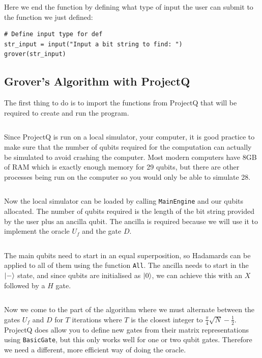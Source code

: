 Here we end the function by defining what type of input the user can submit to the function we just defined:

\begin{verbatim}
# Define input type for def
str_input = input("Input a bit string to find: ")
grover(str_input) 
\end{verbatim}

\subsection{Grover's Algorithm with ProjectQ}

The first thing to do is to import the functions from ProjectQ that will be required to create and run the program.

\inputminted[firstnumber=3, firstline=3, lastline=5]{python}{code/ProjectQ/grover_projectq_guide.txt}

Since ProjectQ is run on a local simulator, your computer, it is good practice to make sure that the number of qubits required for the computation can actually be simulated to avoid crashing the computer. Most modern computers have 8GB of RAM which is exactly enough memory for 29 qubits, but there are other processes being run on the computer so you would only be able to simulate 28.

\inputminted[firstnumber=13, firstline= 13, lastline=16]{python}{code/ProjectQ/grover_projectq_guide.txt}

Now the local simulator can be loaded by calling \texttt{MainEngine} and our qubits allocated. The number of qubits required is the length of the bit string provided by the user plus an ancilla qubit. The ancilla is required because we will use it to implement the oracle $U_f$ and the gate $D$.

\inputminted[firstnumber=22, firstline=22, lastline=25]{python}{code/ProjectQ/grover_projectq_guide.txt}

The main qubits need to start in an equal superposition, so Hadamards can be applied to all of them using the function \texttt{All}. The ancilla needs to start in the $\left\vert{-}\right\rangle$ state, and since qubits are initialised as $\left\vert{0}\right\rangle$, we can achieve this with an $X$ followed by a $H$ gate.

\inputminted[firstnumber=27, firstline=27, lastline=30]{python}{code/ProjectQ/grover_projectq_guide.txt}

Now we come to the part of the algorithm where we must alternate between the gates $U_f$ and $D$ for $T$ iterations where $T$ is the closest integer to $\frac{\pi}{4}\sqrt{N} - \frac{1}{2}$. ProjectQ does allow you to define new gates from their matrix representations using \texttt{BasicGate}, but this only works well for one or two qubit gates. Therefore we need a different, more efficient way of doing the oracle. 


